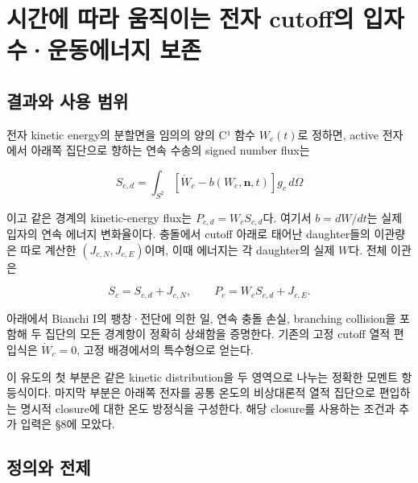 \clearpage

\hypertarget{uxc2dcuxac04uxc5d0-uxb530uxb77c-uxc6c0uxc9c1uxc774uxb294-uxc804uxc790-cutoffuxc758-uxc785uxc790uxc218uxc6b4uxb3d9uxc5d0uxb108uxc9c0-uxbcf4uxc874}{%
\section{시간에 따라 움직이는 전자 cutoff의 입자수·운동에너지 보존}\label{uxc2dcuxac04uxc5d0-uxb530uxb77c-uxc6c0uxc9c1uxc774uxb294-uxc804uxc790-cutoffuxc758-uxc785uxc790uxc218uxc6b4uxb3d9uxc5d0uxb108uxc9c0-uxbcf4uxc874}}

\hypertarget{uxacb0uxacfcuxc640-uxc0acuxc6a9-uxbc94uxc704}{%
\subsection{결과와 사용 범위}\label{uxacb0uxacfcuxc640-uxc0acuxc6a9-uxbc94uxc704}}

전자 kinetic energy의 분할면을 임의의 양의 C¹ 함수 \(W_c(t)\)로 정하면, active 전자에서 아래쪽 집단으로 향하는 연속 수송의 signed number flux는

\[
S_{c,d}=\int_{S^2}[\dot W_c-b(W_c,\boldsymbol n,t)]g_c\,d\Omega
\tag{MC1}
\]

이고 같은 경계의 kinetic-energy flux는 \(P_{c,d}=W_cS_{c,d}\)다. 여기서 \(b=dW/dt\)는 실제 입자의 연속 에너지 변화율이다. 충돌에서 cutoff 아래로 태어난 daughter들의 이관량은 따로 계산한 \((J_{c,N},J_{c,E})\)이며, 이때 에너지는 각 daughter의 실제 \(W\)다. 전체 이관은

\[
S_c=S_{c,d}+J_{c,N},\qquad
P_c=W_cS_{c,d}+J_{c,E}.
\tag{MC2}
\]

아래에서 Bianchi I의 팽창·전단에 의한 일, 연속 충돌 손실, branching collision을 포함해 두 집단의 모든 경계항이 정확히 상쇄함을 증명한다. 기존의 고정 cutoff 열적 편입식은 \(\dot W_c=0\), 고정 배경에서의 특수형으로 얻는다.

이 유도의 첫 부분은 같은 kinetic distribution을 두 영역으로 나누는 정확한 모멘트 항등식이다. 마지막 부분은 아래쪽 전자를 공통 온도의 비상대론적 열적 집단으로 편입하는 명시적 closure에 대한 온도 방정식을 구성한다. 해당 closure를 사용하는 조건과 추가 입력은 §8에 모았다.

\hypertarget{uxc815uxc758uxc640-uxc804uxc81c}{%
\subsection{정의와 전제}\label{uxc815uxc758uxc640-uxc804uxc81c}}

